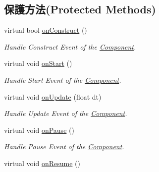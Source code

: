 \subsection*{保護方法(Protected Methods)}
\begin{DoxyCompactItemize}
\item 
virtual bool \hyperlink{class_i_dream_sky_1_1_camera_component_ac7ea89b8cd16133d963a5cc54942f22f}{on\+Construct} ()
\begin{DoxyCompactList}\small\item\em Handle Construct Event of the \hyperlink{class_i_dream_sky_1_1_component}{Component}. \end{DoxyCompactList}\item 
virtual void \hyperlink{class_i_dream_sky_1_1_camera_component_ae4ee1cdff7b10f4d275d4db47e7f2c55}{on\+Start} ()\hypertarget{class_i_dream_sky_1_1_camera_component_ae4ee1cdff7b10f4d275d4db47e7f2c55}{}\label{class_i_dream_sky_1_1_camera_component_ae4ee1cdff7b10f4d275d4db47e7f2c55}

\begin{DoxyCompactList}\small\item\em Handle Start Event of the \hyperlink{class_i_dream_sky_1_1_component}{Component}. \end{DoxyCompactList}\item 
virtual void \hyperlink{class_i_dream_sky_1_1_camera_component_aaf42005f7bc8c4f93b609c8666d65a30}{on\+Update} (float dt)
\begin{DoxyCompactList}\small\item\em Handle Update Event of the \hyperlink{class_i_dream_sky_1_1_component}{Component}. \end{DoxyCompactList}\item 
virtual void \hyperlink{class_i_dream_sky_1_1_camera_component_af22f1839001c7eea5c4de87fd5901212}{on\+Pause} ()\hypertarget{class_i_dream_sky_1_1_camera_component_af22f1839001c7eea5c4de87fd5901212}{}\label{class_i_dream_sky_1_1_camera_component_af22f1839001c7eea5c4de87fd5901212}

\begin{DoxyCompactList}\small\item\em Handle Pause Event of the \hyperlink{class_i_dream_sky_1_1_component}{Component}. \end{DoxyCompactList}\item 
virtual void \hyperlink{class_i_dream_sky_1_1_camera_component_a5808958ab0c9cd496bf419b15a9bab1f}{on\+Resume} ()\hypertarget{class_i_dream_sky_1_1_camera_component_a5808958ab0c9cd496bf419b15a9bab1f}{}\label{class_i_dream_sky_1_1_camera_component_a5808958ab0c9cd496bf419b15a9bab1f}


\end{DoxyCompactItemize}
